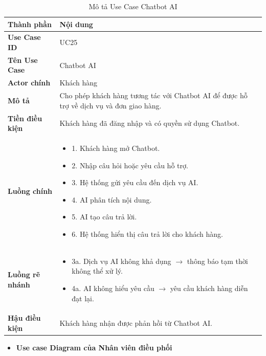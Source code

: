 \begin{longtable}{|L{3cm}|L{11cm}|}
\caption{Mô tả Use Case Chatbot AI}
\label{tab:mo-ta-uc25-chatbot}
\\
\hline
\textbf{Thành phần} & \textbf{Nội dung} \\
\hline
\textbf{Use Case ID} & UC25 \\
\hline
\textbf{Tên Use Case} & Chatbot AI \\
\hline
\textbf{Actor chính} & Khách hàng \\
\hline
\textbf{Mô tả} & Cho phép khách hàng tương tác với Chatbot AI để được hỗ trợ về dịch vụ và đơn giao hàng. \\
\hline
\textbf{Tiền điều kiện} & Khách hàng đã đăng nhập và có quyền sử dụng Chatbot. \\
\hline
\textbf{Luồng chính} & \begin{itemize}[leftmargin=*,topsep=2pt,itemsep=2pt]
\item 1. Khách hàng mở Chatbot.
\item 2. Nhập câu hỏi hoặc yêu cầu hỗ trợ.
\item 3. Hệ thống gửi yêu cầu đến dịch vụ AI.
\item 4. AI phân tích nội dung.
\item 5. AI tạo câu trả lời.
\item 6. Hệ thống hiển thị câu trả lời cho khách hàng.
\end{itemize} \\
\hline
\textbf{Luồng rẽ nhánh} & \begin{itemize}[leftmargin=*,topsep=2pt,itemsep=2pt]
\item 3a. Dịch vụ AI không khả dụng $\rightarrow$ thông báo tạm thời không thể xử lý.
\item 4a. AI không hiểu yêu cầu $\rightarrow$ yêu cầu khách hàng diễn đạt lại.
\end{itemize} \\
\hline
\textbf{Hậu điều kiện} & Khách hàng nhận được phản hồi từ Chatbot AI. \\
\hline
\end{longtable}



\begin{itemize}
\item
  \textbf{Use case Diagram của Nhân viên điều phối} 
\end{itemize}

